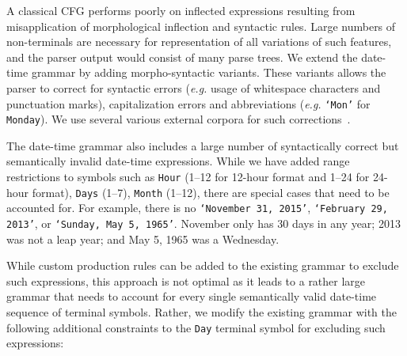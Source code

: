 A classical CFG performs poorly on inflected expressions resulting from misapplication of morphological inflection and syntactic rules. Large numbers of non-terminals are necessary for representation of all variations of such features, and the parser output would consist of many parse trees. We extend the date-time grammar by adding morpho-syntactic variants. These variants allows the parser to correct for syntactic errors (\textit{e.g.} usage of whitespace characters and punctuation marks), capitalization errors and abbreviations (\textit{e.g.} \texttt{`Mon'} for \texttt{Monday}). We use several various external corpora for such corrections~\cite{nltkcorpora}.

The date-time grammar also includes a large number of syntactically correct but semantically invalid date-time expressions. While we have added range restrictions to symbols such as \texttt{Hour} (1--12 for 12-hour format and 1--24 for 24-hour format), \texttt{Days} (1--7), \texttt{Month} (1--12), there are special cases that need to be accounted for. For example, there is no  \texttt{`November 31, 2015'}, \texttt{`February 29, 2013'}, or \texttt{`Sunday, May  5, 1965'}. November only has 30 days in any year; 2013 was not a leap year; and May 5, 1965 was a Wednesday.

While custom production rules can be added to the existing grammar to exclude such expressions, this approach is not optimal as it leads to a rather large grammar that needs to account for every single semantically valid date-time sequence of terminal symbols. Rather, we modify the existing grammar with the following additional constraints to the \texttt{Day} terminal symbol for excluding such expressions:

